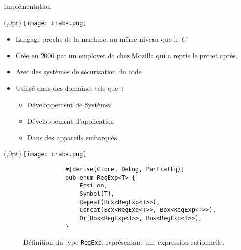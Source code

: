 \documentclass[aspectratio=169,xcolor=dvipsnames]{beamer}
\begin{document}



\begin{frame}{Implémentation}
    \begin{textblock*}{20pt}(\textwidth-70pt,0pt)
        \texttt{[image: crabe.png]}
    \end{textblock*}
    \begin{itemize}
        \item[\textbullet] Langage proche de la machine, au même niveau que le 
        \textit{C}
        \item[\textbullet] Crée en 2006 par un employer de chez Mozilla qui a 
            repris le projet après.
        \item[\textbullet] Avec des systèmes de sécurisation du code
        \item[\textbullet] Utilisé dans des domaines tels que~:
            \begin{itemize}
                \item[\textbullet] Développement de Systèmes
                \item[\textbullet] Développement d'application
                \item[\textbullet] Dans des appareils embarqués
            \end{itemize} 
    \end{itemize}
\end{frame}


\begin{frame}[fragile]
    \begin{textblock*}{20pt}(\textwidth-70pt,0pt)
        \texttt{[image: crabe.png]}
    \end{textblock*}
    \begin{figure}  
        \begin{verbatim}
            #[derive(Clone, Debug, PartialEq)]
            pub enum RegExp<T> {
                Epsilon,
                Symbol(T),
                Repeat(Box<RegExp<T>>),
                Concat(Box<RegExp<T>>, Box<RegExp<T>>),
                Or(Box<RegExp<T>>, Box<RegExp<T>>),
            }
        \end{verbatim}
        \caption{
            Définition du type \texttt{RegExp}, représentant une 
            expression rationnelle.
        }
    \end{figure}  
\end{frame}
\end{document}
